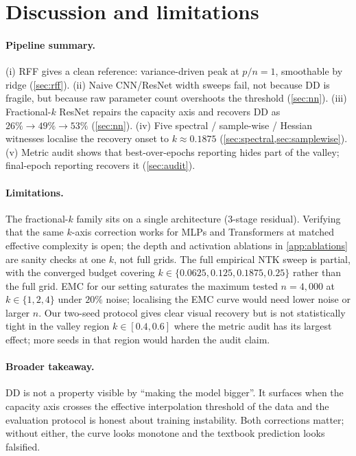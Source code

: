 \section{Discussion and limitations}
\label{sec:discussion}

\paragraph{Pipeline summary.} (i) RFF gives a clean reference: variance-driven peak at $p/n=1$, smoothable by ridge (\cref{sec:rff}). (ii) Naive CNN/ResNet width sweeps fail, not because DD is fragile, but because raw parameter count overshoots the threshold (\cref{sec:nn}). (iii) Fractional-$k$ ResNet repairs the capacity axis and recovers DD as $26\%\!\to\!49\%\!\to\!53\%$ (\cref{sec:nn}). (iv) Five spectral / sample-wise / Hessian witnesses localise the recovery onset to $k\!\approx\!0.1875$ (\cref{sec:spectral,sec:samplewise}). (v) Metric audit shows that best-over-epochs reporting hides part of the valley; final-epoch reporting recovers it (\cref{sec:audit}).

\paragraph{Limitations.} The fractional-$k$ family sits on a single architecture (3-stage residual). Verifying that the same $k$-axis correction works for MLPs and Transformers at matched effective complexity is open; the depth and activation ablations in \cref{app:ablations} are sanity checks at one $k$, not full grids. The full empirical NTK sweep is partial, with the converged budget covering $k\!\in\!\{0.0625, 0.125, 0.1875, 0.25\}$ rather than the full grid. EMC for our setting saturates the maximum tested $n=4{,}000$ at $k\!\in\!\{1,2,4\}$ under $20\%$ noise; localising the EMC curve would need lower noise or larger $n$. Our two-seed protocol gives clear visual recovery but is not statistically tight in the valley region $k\!\in\![0.4, 0.6]$ where the metric audit has its largest effect; more seeds in that region would harden the audit claim.

\paragraph{Broader takeaway.} DD is not a property visible by ``making the model bigger''. It surfaces when the capacity axis crosses the effective interpolation threshold of the data and the evaluation protocol is honest about training instability. Both corrections matter; without either, the curve looks monotone and the textbook prediction looks falsified.

